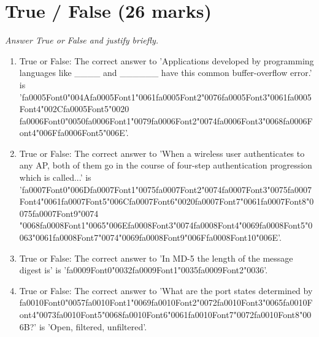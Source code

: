 \documentclass[12pt]{article}
\begin{document}
\section*{True / False (26 marks)}
\textit{Answer True or False and justify briefly.}
\begin{enumerate}[label=\arabic*.]
\item True or False: The correct answer to 'Applications developed by programming languages like \_\_\_\_ and \_\_\_\_\_\_ have this common buffer-overflow error.' is '{\csname fa0005Font0\endcsname\char"004A}{\csname fa0005Font1\endcsname\char"0061}{\csname fa0005Font2\endcsname\char"0076}{\csname fa0005Font3\endcsname\char"0061}{\csname fa0005Font4\endcsname\char"002C}{\csname fa0005Font5\endcsname\char"0020} {\csname fa0006Font0\endcsname\char"0050}{\csname fa0006Font1\endcsname\char"0079}{\csname fa0006Font2\endcsname\char"0074}{\csname fa0006Font3\endcsname\char"0068}{\csname fa0006Font4\endcsname\char"006F}{\csname fa0006Font5\endcsname\char"006E}'.
\item True or False: The correct answer to 'When a wireless user authenticates to any AP, both of them go in the course of four-step authentication progression which is called...' is '{\csname fa0007Font0\endcsname\char"006D}{\csname fa0007Font1\endcsname\char"0075}{\csname fa0007Font2\endcsname\char"0074}{\csname fa0007Font3\endcsname\char"0075}{\csname fa0007Font4\endcsname\char"0061}{\csname fa0007Font5\endcsname\char"006C}{\csname fa0007Font6\endcsname\char"0020}{\csname fa0007Font7\endcsname\char"0061}{\csname fa0007Font8\endcsname\char"0075}{\csname fa0007Font9\endcsname\char"0074} {\char"0068}{\csname fa0008Font1\endcsname\char"0065}{\char"006E}{\csname fa0008Font3\endcsname\char"0074}{\csname fa0008Font4\endcsname\char"0069}{\csname fa0008Font5\endcsname\char"0063}{\char"0061}{\csname fa0008Font7\endcsname\char"0074}{\char"0069}{\csname fa0008Font9\endcsname\char"006F}{\csname fa0008Font10\endcsname\char"006E}'.
\item True or False: The correct answer to 'In MD-5 the length of the message digest is' is '{\csname fa0009Font0\endcsname\char"0032}{\csname fa0009Font1\endcsname\char"0035}{\csname fa0009Font2\endcsname\char"0036}'.
\item True or False: The correct answer to 'What are the port states determined by {\csname fa0010Font0\endcsname\char"0057}{\csname fa0010Font1\endcsname\char"0069}{\csname fa0010Font2\endcsname\char"0072}{\csname fa0010Font3\endcsname\char"0065}{\csname fa0010Font4\endcsname\char"0073}{\csname fa0010Font5\endcsname\char"0068}{\csname fa0010Font6\endcsname\char"0061}{\csname fa0010Font7\endcsname\char"0072}{\csname fa0010Font8\endcsname\char"006B}?' is 'Open, filtered, unfiltered'.

\end{enumerate}
\end{document}
